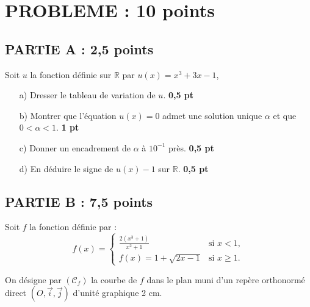 \documentclass[12pt,a4paper]{article}
\begin{document}
\section*{PROBLEME : 10 points}

\subsection*{PARTIE A : 2,5 points}

Soit $u$ la fonction définie sur $\mathbb{R}$ par $u(x) = x^3 + 3x - 1$,

\begin{enumerate}
    \item[a)] Dresser le tableau de variation de $u$. \hfill \textbf{0,5 pt}
    \item[b)] Montrer que l'équation $u(x) = 0$ admet une solution unique $\alpha$ et que $0 < \alpha < 1$. \hfill \textbf{1 pt}
    \item[c)] Donner un encadrement de $\alpha$ à $10^{-1}$ près. \hfill \textbf{0,5 pt}
    \item[d)] En déduire le signe de $u(x) - 1$ sur $\mathbb{R}$. \hfill \textbf{0,5 pt}
\end{enumerate}

\subsection*{PARTIE B : 7,5 points}

Soit $f$ la fonction définie par :
\[
f(x) = 
\begin{cases} 
    \frac{2(x^3 + 1)}{x^2 + 1} & \text{si } x < 1, \\
    f(x) = 1 + \sqrt{2x - 1} & \text{si } x \geq 1.
\end{cases}
\]

On désigne par $(\mathcal{C}_f)$ la courbe de $f$ dans le plan muni d’un repère orthonormé direct 
$\left(O, \vec{i}, \vec{j}\right)$ d’unité graphique 2 cm.
\end{document}

